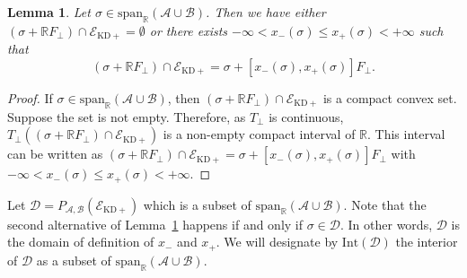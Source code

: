 \documentclass[a4paper, notitlepage, 11pt]{article}
\numberwithin{equation}{section}
\newcommand{\mcl}[1]{\mathcal{#1}}
\newcommand{\Acal}{{\mathcal A}}
\newcommand{\Bcal}{{\mathcal B}}
\newcommand{\EcalKDC}{{\mathcal E}_{\mathrm{KD+}}}
\newcommand{\spanRAB}{{\mathrm{span}_{\R}(\Acal\cup\Bcal)}}
\newcommand{\R}{\mathbb{R}}
\newtheorem{Lemma}[Theorem]{Lemma}
\begin{document}
\begin{Lemma} \label{lem:EKDCorthV2}
Let $\sigma\in\spanRAB$. Then we have either $\left(\sigma + \R F_{\perp}\right)\cap \EcalKDC = \emptyset$ or there exists $-\infty < x_{-}(\sigma) \leqslant x_{+}(\sigma) < +\infty$ such that $$\left(\sigma + \R F_{\perp}\right) \cap \EcalKDC = \sigma + [x_{-}(\sigma),x_{+}(\sigma)] F_{\perp}.
$$
\end{Lemma}

\begin{proof}
If $\sigma \in\spanRAB$, then $\left(\sigma + \R F_{\perp}\right)\cap \EcalKDC$ is a compact convex set. Suppose the set is not empty. Therefore, as $T_{\perp}$ is continuous, $T_{\perp}(\left(\sigma + \R F_{\perp}\right)\cap \EcalKDC)$ is a non-empty compact interval of $\R$. This interval can be written as $\left(\sigma + \R F_{\perp}\right) \cap \EcalKDC = \sigma + [x_{-}(\sigma),x_{+}(\sigma)] F_{\perp}$ with $-\infty < x_{-}(\sigma) \leqslant x_{+}(\sigma) < +\infty$. 
\end{proof}

Let $\mcl{D} = P_{\Acal,\Bcal}(\EcalKDC)$ which is a subset of $\spanRAB$. Note that the second alternative of Lemma~\ref{lem:EKDCorthV2} happens if and only if $\sigma\in\mcl{D}$. In other words, $\mcl{D}$ is the domain of definition of $x_{-}$ and $x_{+}$. We will designate by $\mathrm{Int}(\mcl{D})$ the interior of $\mcl{D}$ as a subset of $\spanRAB$.
\end{document}

